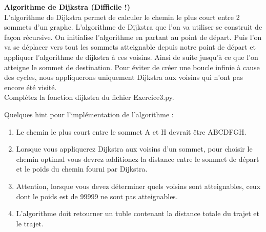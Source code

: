 \begin{Exercice}[15 minutes] \textbf{Algorithme de Dijkstra (Difficile !)}\\
    L'algorithme de Dijkstra permet de calculer le chemin le plus court entre 2 sommets d'un graphe. L'algorithme de Dijkstra que l'on va utiliser se construit de façon récursive. On initialise l'algorithme en partant au point de départ. Puis l'on va se déplacer vers tout les sommets atteignable depuis notre point de départ et appliquer l'algorithme de dijkstra à ces voisins. Ainsi de suite jusqu'à ce que l'on atteigne le sommet de destination. Pour éviter de créer une boucle infinie à cause des cycles, nous appliquerons uniquement Dijkstra aux voisins qui n'ont pas encore été visité.\\
    
    Complétez la fonction dijkstra du fichier Exercice3.py.
    \begin{conseil}
        Quelques hint pour l'implémentation de l'algorithme :
        \begin{enumerate}
            \item Le chemin le plus court entre le sommet A et H devrait être ABCDFGH.
            \item Lorsque vous appliquerez Dijkstra aux voisins d'un sommet, pour choisir le chemin optimal vous devrez additionez la distance entre le sommet de départ et le poids du chemin fourni par Dijkstra.
            \item Attention, lorsque vous devez déterminer quels voisins sont atteignables, ceux dont le poids est de 99999 ne sont pas atteignables.
            \item L'algorithme doit retourner un tuble contenant la distance totale du trajet et le trajet.
        \end{enumerate}
    \end{conseil}
    \begin{solution}
        
    \end{solution}
\end{Exercice}


